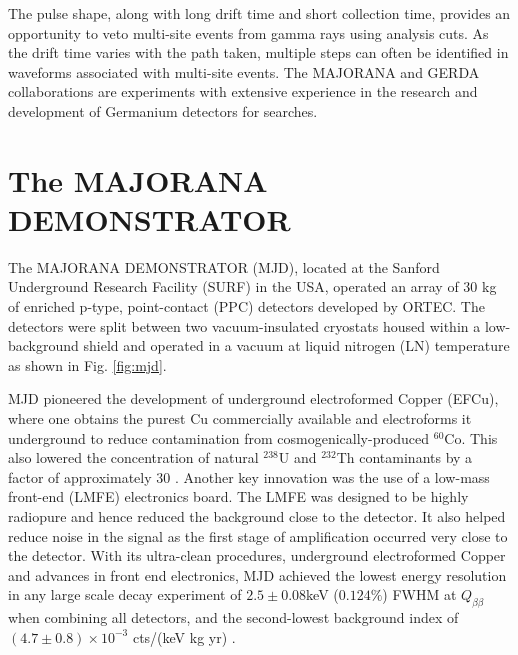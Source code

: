 The pulse shape, along with long drift time and short collection time, provides an opportunity to veto multi-site events from gamma rays using analysis cuts. As the drift time varies with the path taken, multiple steps can often be identified in waveforms associated with multi-site events. The MAJORANA and GERDA collaborations are experiments with extensive experience in the research and development of Germanium detectors for {\onbb} searches.


\section{The MAJORANA DEMONSTRATOR}

The MAJORANA DEMONSTRATOR (MJD), located at the Sanford Underground Research Facility (SURF) in the USA, operated an array of 30 kg of enriched p-type, point-contact (PPC) detectors developed by ORTEC. The detectors were split between two vacuum-insulated cryostats housed within a low-background shield and operated in a vacuum at liquid nitrogen (LN) temperature as shown in Fig. \ref{fig:mjd}. 

MJD pioneered the development of underground electroformed Copper (EFCu), where one obtains the purest Cu commercially available and electroforms it underground to reduce contamination from cosmogenically-produced $^{60}$Co. This also lowered the concentration of natural $^{238}$U and $^{232}$Th contaminants by a factor of approximately 30 \cite{Abgrall:2016cct}. Another key innovation was the use of a low-mass front-end (LMFE) electronics board. The LMFE was designed to be highly radiopure and hence reduced the background close to the detector. It also helped reduce noise in the signal as the first stage of amplification occurred very close to the detector. With its ultra-clean procedures, underground electroformed Copper and advances in front end electronics, MJD achieved the lowest energy resolution in any large scale {\onbb} decay experiment of $2.5\pm0.08$keV ($0.124\%$) FWHM at $Q_{\beta\beta}$ when combining all detectors, and the second-lowest background index of $(4.7\pm 0.8) \times 10^{-3}$ cts/(keV kg yr) \cite{Majorana_2019nbd}.

